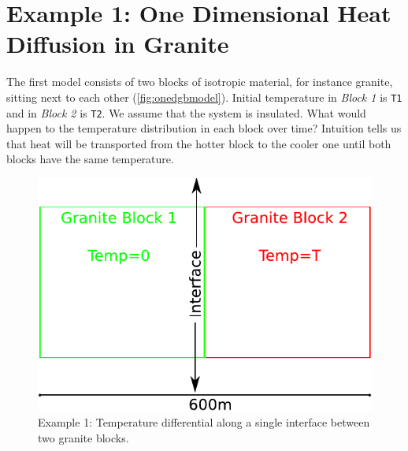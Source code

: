 
%
%
%

\section{Example 1: One Dimensional Heat Diffusion in Granite}
\label{Sec:1DHDv00}

The first model consists of two blocks of isotropic material, for instance
granite, sitting next to each other (\autoref{fig:onedgbmodel}).
Initial temperature in \textit{Block 1} is \verb|T1| and in \textit{Block 2} is
\verb|T2|.
We assume that the system is insulated.
What would happen to the temperature distribution in each block over time? 
Intuition tells us that heat will be transported from the hotter block to the
cooler one until both
blocks have the same temperature.

\begin{figure}[ht]
\centerline{\includegraphics[width=4.in]{figures/onedheatdiff001}}
\caption{Example 1: Temperature differential along a single interface between
two granite blocks.}
\label{fig:onedgbmodel}
\end{figure}

